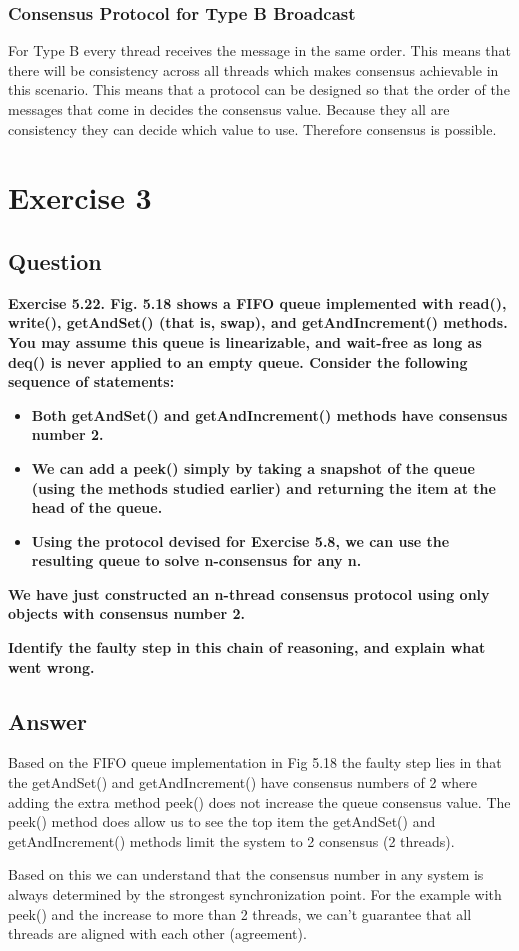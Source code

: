 \documentclass{article}
\begin{document}
\subsubsection*{Consensus  Protocol for Type B Broadcast}
For Type B every thread receives the message in the same order. This means that there will be consistency across all threads which makes consensus achievable in this scenario. This means that a protocol can be designed so that the order of the messages that come in decides the consensus value. Because they all are consistency they can decide which value to use. Therefore consensus is possible.




\section*{Exercise 3}
\subsection*{Question}
\textbf{Exercise 5.22. Fig. 5.18 shows a FIFO queue implemented with read(), write(), getAndSet() (that is, swap), and getAndIncrement() methods. You may assume this queue is linearizable, and wait-free as long as deq() is never applied to an empty queue. Consider the following sequence of statements:}
\begin{itemize}
    \item \textbf{Both getAndSet() and getAndIncrement() methods have consensus number 2.}
    \item \textbf{We can add a peek() simply by taking a snapshot of the queue (using the methods studied earlier) and returning the item at the head of the queue.}
    \item \textbf{Using the protocol devised for Exercise 5.8, we can use the resulting queue to solve n-consensus for any n.}
\end{itemize}

\textbf{We have just constructed an n-thread consensus protocol using only objects with consensus number 2.}

\textbf{Identify the faulty step in this chain of reasoning, and explain what went wrong.}

\subsection*{Answer}
Based on the FIFO queue implementation in Fig 5.18 the faulty step lies in that the getAndSet() and getAndIncrement() have consensus numbers of 2 where adding the extra method peek() does not increase the queue consensus value. The peek() method does allow us to see the top item the getAndSet() and getAndIncrement() methods limit the system to 2 consensus (2 threads).

Based on this we can understand that the consensus number in any system is always determined by the strongest synchronization point. For the example with peek() and the increase to more than 2 threads, we can't guarantee that all threads are aligned with each other (agreement). 


\newpage
\printbibliography
\end{document}
